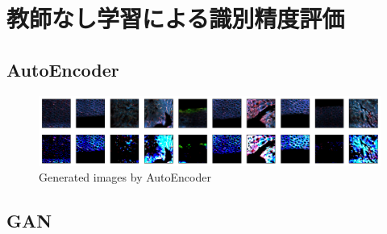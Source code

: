 \section{教師なし学習による識別精度評価}

\subsection{AutoEncoder}

\begin{figure}[H]
	\centering
	\includegraphics[width=\linewidth]{fig/chapter4/unet_ae}
	\caption{Generated images by AutoEncoder}
	\label{fig:unetae}
\end{figure}


\subsection{GAN}

